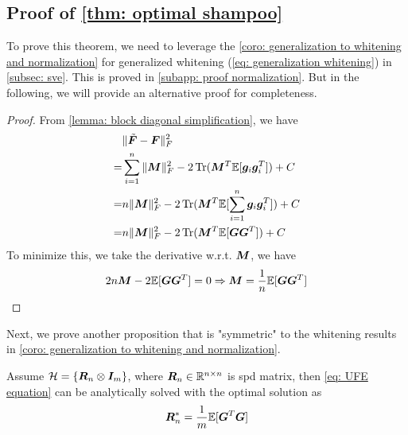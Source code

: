 \subsection{Proof of \cref{thm: optimal shampoo}}
\label{subapp: proof of shampoo optimiality}

To prove this theorem, we need to leverage the \cref{coro: generalization to whitening and normalization} for generalized whitening (\cref{eq: generalization whitening}) in \cref{subsec: sve}. This is proved in \cref{subapp: proof normalization}. But in the following, we will provide an alternative proof for completeness.

\begin{proof}
    From \cref{lemma: block diagonal simplification}, we have
    \begin{align*}
        &\Vert\tilde{\bm{F}}-{\bm{F}}\Vert_F^2 \\
        =& \sum_{i=1}^n \Vert{\bm{M}}\Vert_F^2 - 2\operatorname{Tr}({\bm{M}}^T\mathbb{E}[{\bm{g}}_i{\bm{g}}_i^T]) + C\\
        =& n\Vert{\bm{M}}\Vert_F^2 - 2\operatorname{Tr}({\bm{M}}^T\mathbb{E}[\sum_{i=1}^n {\bm{g}}_i{\bm{g}}_i^T]) + C\\
        =& n\Vert{\bm{M}}\Vert_F^2 - 2\operatorname{Tr}({\bm{M}}^T\mathbb{E}[{\bm{G}}{\bm{G}}^T]) + C \\
    \end{align*}
    To minimize this, we take the derivative w.r.t. ${\bm{M}}$, we have
    \begin{align*}
        2n{\bm{M}} - 2\mathbb{E}[{\bm{G}}{\bm{G}}^T] = 0 \Rightarrow {\bm{M}} = \frac{1}{n} \mathbb{E}[{\bm{G}}{\bm{G}}^T]
    \end{align*}
\end{proof}
Next, we prove another proposition that is "symmetric" to the whitening results in \cref{coro: generalization to whitening and normalization}.
\begin{proposition}
    Assume $\mathcal{H} = \{{\bm{R}}_n \otimes {\bm{I}}_m\}$, where ${\bm{R}}_n\in \mathbb{R}^{n\times n}$ is \gls{spd} matrix, then \cref{eq: UFE equation} can be analytically solved with the optimal solution as 
    \begin{equation}
        {\bm{R}}_n^* = \frac{1}{m} \mathbb{E}[{\bm{G}}^T{\bm{G}}]
        \label{eq: optimal shampoo right}
    \end{equation}
    \label{prop: optimal shampoo right}
\end{proposition}
